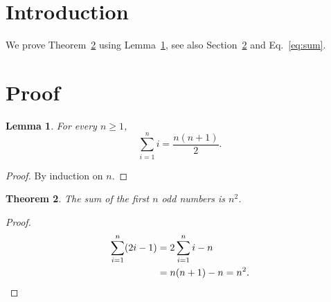 \documentclass{article}
\newtheorem{theorem}{Theorem}[section]
\newtheorem{lemma}[theorem]{Lemma}
\begin{document}
\section{Introduction}\label{sec:intro}
We prove Theorem~\ref{thm:main} using Lemma~\ref{lem:sum}, see also
Section~\ref{sec:proof} and Eq.~\eqref{eq:sum}.

\section{Proof}\label{sec:proof}
\begin{lemma}\label{lem:sum}
  For every $n \geq 1$,
  \begin{equation}\label{eq:sum}
    \sum_{i=1}^{n} i = \frac{n(n+1)}{2}.
  \end{equation}
\end{lemma}
\begin{proof}
  By induction on $n$.
\end{proof}
\begin{theorem}\label{thm:main}
  The sum of the first $n$ odd numbers is $n^2$.
\end{theorem}
\begin{proof}
  \begin{align*}
    \sum_{i=1}^{n} (2i-1) &= 2\sum_{i=1}^{n} i - n \\
                          &= n(n+1) - n = n^2. \qedhere
  \end{align*}
\end{proof}
\end{document}
